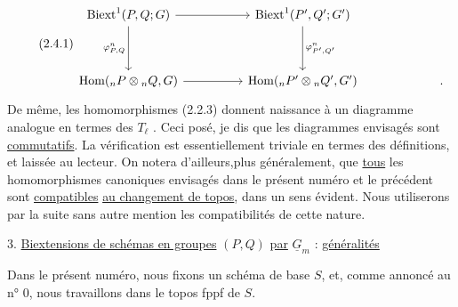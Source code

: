\begin{equation}\tag{2.4.1}
\begin{tikzcd}[column sep=huge, row sep=huge]
\mathrm{Biext}^1(P,Q;G) \arrow[r] \arrow[d, "{\varphi^n_{P,Q}}"'] & \mathrm{Biext}^1(P',Q';G') \arrow[d, "{\varphi^n_{P',Q'}}"] & \\
\mathrm{Hom}({}_nP \otimes {}_nQ,G) \arrow[r] & \mathrm{Hom}({}_nP' \otimes {}_nQ',G') & \quad .
\end{tikzcd}
\end{equation}
De même, les homomorphismes (2.2.3) donnent naissance à un diagramme analogue en termes des $T_\ell$ . Ceci posé, je dis que les diagrammes envisagés sont \underline{commutatifs}. La vérification est essentiellement triviale en termes des définitions, et laissée au lecteur. On notera d'ailleurs,plus généralement, que \underline{tous} les homomorphismes canoniques envisagés dans le présent numéro et le précédent sont \underline{compatibles} \underline{au changement de topos}, dans un sens évident. Nous utiliserons par la suite sans autre mention les compatibilités de cette nature.




3. \underline{Biextensions de schémas en groupes} $(P,Q)$ \underline{par} $\underline{G}_m$ : \underline{généralités}

Dans le présent numéro, nous fixons un schéma de base $S$, et, comme annoncé au n° 0, nous travaillons dans le topos fppf de $S$.

